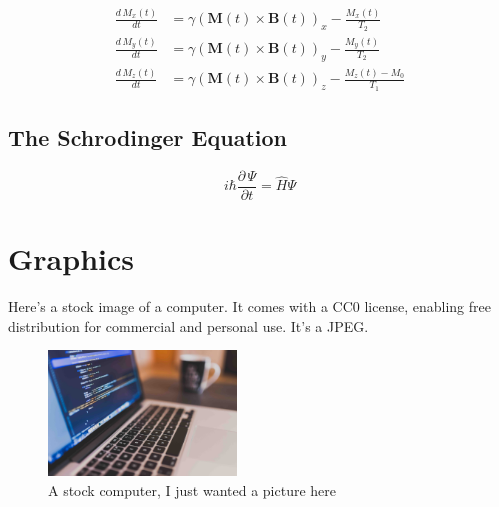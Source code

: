 \documentclass{workreport}
\begin{document}
\begin{body}
	\begin{align}
		\frac{d\, M_x(t)}{dt} &= \gamma(\mathbf{M}(t) \times \mathbf{B}(t))_x - \frac{M_x(t)}{T_2} \\
		\frac{d\, M_y(t)}{dt} &= \gamma(\mathbf{M}(t) \times \mathbf{B}(t))_y - \frac{M_y(t)}{T_2} \\
		\frac{d\, M_z(t)}{dt} &= \gamma(\mathbf{M}(t) \times \mathbf{B}(t))_z - \frac{M_z(t) - M_0}{T_1}
	\end{align}

\subsection{The Schrodinger Equation}

	\begin{equation}
		i\hbar \frac{\partial \, \Psi}{\partial t} = \hat{H}\Psi
	\end{equation}

\section{Graphics}

	Here's a stock image of a computer. It comes with a CC0 license, enabling
	free distribution for commercial and personal use. It's a JPEG.

	\begin{figure}[!ht]
		\centering
		\label{fig:stock_computer}
		\includegraphics[width=5cm]{./images/stock-image.jpg}
		\caption{A stock computer, I just wanted a picture here}
	\end{figure}


\end{body}
\end{document}
